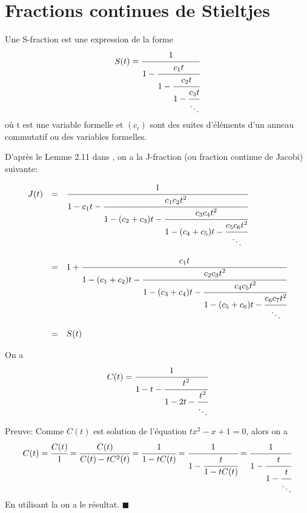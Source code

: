 \section{Fractions continues de Stieltjes}
\begin{definition}
	\begin{rm}
		Une S-fraction est une expression de la forme
		\[
			S(t)=\cfrac{1}{1-\cfrac{c_{1}t}{1-\cfrac{c_{2}t}{1-\cfrac{c_{3}t}{\ddots}}}}
		\]
		où t est une variable formelle et $(c_{i})$ sont des suites d'éléments d'un anneau commutatif ou des variables formelles.
	\end{rm}
\end{definition}
D'après le Lemme 2.11 dans \cite{ref30}, on a la J-fraction (ou fraction continue de Jacobi) suivante:
\begin{proposition}\label{j-frac}
	\begin{rm}
		\[
			\begin{array}{l l l}

				J(t) & =       & \cfrac{1}{1-c_{1}t-\cfrac{c_{1}c_{2}t^2}{1-(c_{2}+c_{3})t-\cfrac{c_{3}c_{4}t^2}{1-(c_{4}+c_{5})t-\cfrac{c_{5}c_{6}t^2}{\ddots}}}}                \\
				     & \text{} &                                                                                                                                                  \\

				     & =       & 1+\cfrac{c_{1}t}{1-(c_{1}+c_{2})t-\cfrac{c_{2}c_{3}t^2}{1-(c_{3}+c_{4})t-\cfrac{c_{4}c_{5}t^2}{1-(c_{5}+c_{6})t-\cfrac{c_{6}c_{7}t^2}{\ddots}}}} \\
				     & \text{} &                                                                                                                                                  \\
				     & =       & S(t)
			\end{array}
		\]
	\end{rm}
\end{proposition}

\begin{proposition}\label{cat-frac}
	On a
	\[C(t) = \cfrac{1}{1-t-\cfrac{t^2}{1-2t-\cfrac{t^2}{\ddots}}} \]
\end{proposition}
Preuve:
Comme $C(t)$ est solution de l'équation $tx^{2} - x +1 =0$, alors on a
\[
	C(t) = \cfrac{C(t)}{1}=\cfrac{C(t)}{C(t)-tC^2(t)}=\cfrac{1}{1-tC(t)}= \cfrac{1}{1-\cfrac{t}{1-tC(t)}} = \cfrac{1}{1-\cfrac{t}{1-\cfrac{t}{\ddots}}}
\]
En utilisant la  on a le résultat. \hspace{10pt} $\blacksquare$

